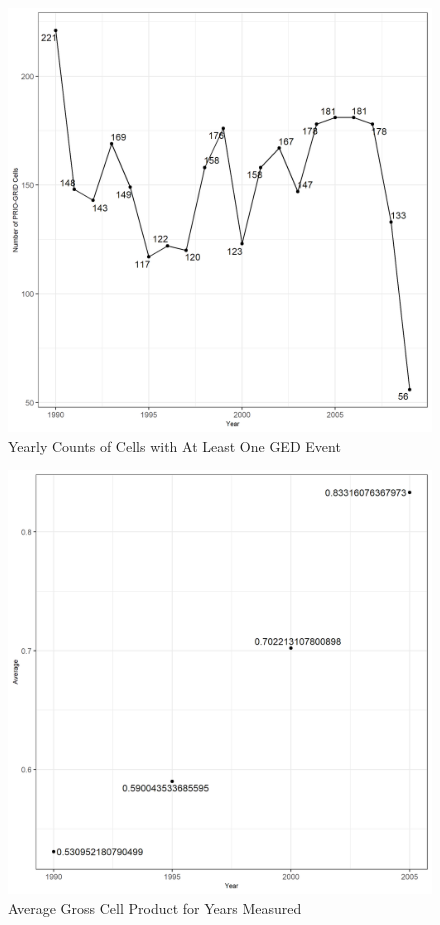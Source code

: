 \begin{figure}
	\includegraphics[scale=.7]{fig5}
	\caption{Yearly Counts of Cells with At Least One GED Event}
\end{figure} 
\begin{figure}
	\includegraphics[scale=.7]{fig6}
	\caption{Average Gross Cell Product for Years Measured}
\end{figure} 
